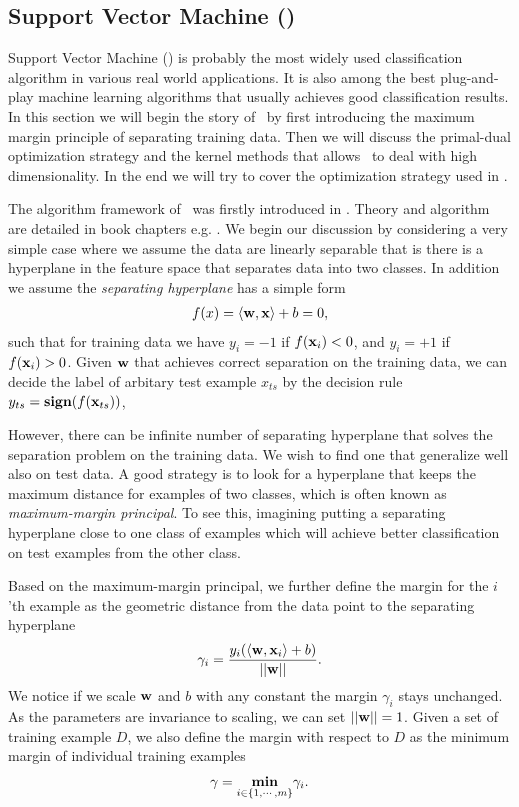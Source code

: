 

%
\subsection{Support Vector Machine (\svm)}
\label{sc_svm}

Support Vector Machine (\svm) is probably the most widely used classification algorithm in various real world applications.
It is also among the best plug-and-play machine learning algorithms that usually achieves good classification results.
In this section we will begin the story of \svm\ by first introducing the maximum margin principle of separating training data.
Then we will discuss the primal-dual optimization strategy and the kernel methods that allows \svm\ to deal with high dimensionality.
In the end we will try to cover the optimization strategy used in \svm.

The algorithm framework of \svm\ was firstly introduced in \citep{Boser92,Cortes95support}.
Theory and algorithm are detailed in book chapters e.g. \citep{Scholkopf02learning,taylor04,Bishop07}.
We begin our discussion by considering a very simple case where we assume the data are linearly separable that is there is a hyperplane in the feature space that separates data into two classes.
In addition we assume the \textit{separating hyperplane} has a simple form
\begin{align*}
	f(x)=\langle \mathbf {w}, \mathbf {x} \rangle + b = 0,
\end{align*}
such that for training data we have $y_i=-1$ if $f(\mathbf {x}_i)<0$, and $y_i=+1$ if $f(\mathbf {x}_i)>0$.
Given $\mathbf {w}$ that achieves correct separation on the training data, we can decide the label of arbitary test example $x_{ts}$ by the decision rule $y_{ts}=\textbf{sign}(f(\mathbf {x}_{ts}))$, 

However, there can be infinite number of separating hyperplane that solves the separation problem on the training data.
We wish to find one that generalize well also on test data.
A good strategy is to look for a hyperplane that keeps the maximum distance for examples of two classes, which is often known as \textit{maximum-margin principal}.
To see this, imagining putting a separating hyperplane close to one class of examples which will achieve better classification on test examples from the other class.

Based on the maximum-margin principal, we further define the margin for the $i$'th example as the geometric distance from the data point to the separating hyperplane
\begin{align*}
	\gamma_i = \frac{y_i(\langle \mathbf {w}, \mathbf {x}_i \rangle+b)}{\left|\left| \mathbf {w} \right|\right|}.
\end{align*}
We notice if we scale $\mathbf {w}$ and $b$ with any constant the margin $\gamma_i$ stays unchanged. 
As the parameters are invariance to scaling, we can set $\left|\left| \mathbf {w} \right|\right|=1$.
Given a set of training example $D$, we also define the margin with respect to $D$ as the minimum margin of individual training examples
\begin{align*}
	\gamma = \underset{i\in\{1,\cdots,m\}}{\textbf{min}}\gamma_i.
\end{align*}

